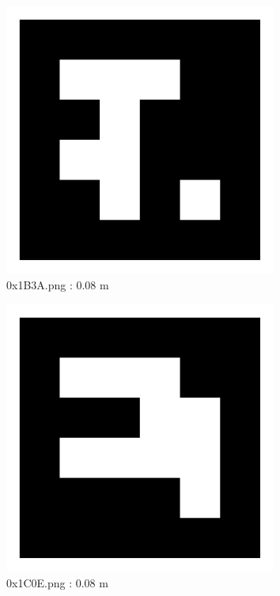 \documentclass[11pt,a4,BCOR=0cm]{scrartcl}
\begin{document}
\begin{figure}
  \centering
    \includegraphics[width=8.955cm]{0x1B3A.pdf}
    \caption{0x1B3A.png : 0.08 m}
    \label{fig:0x1B3A.pdf}
  
\end{figure} 

\begin{figure}
  \centering
    \includegraphics[width=8.955cm]{0x1C0E.pdf}
    \caption{0x1C0E.png : 0.08 m}
    \label{fig:0x1C0E.pdf}
  
\end{figure} 

\clearpage
\end{document}
